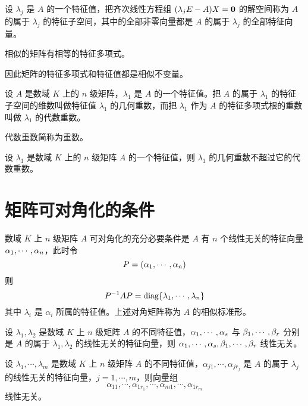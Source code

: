 设 $\lambda_j$ 是 $A$ 的一个特征值，把齐次线性方程组 $(\lambda_jE-A)X = \boldsymbol{0}$ 的解空间称为 $A$ 的属于 $\lambda_j$ 的特征子空间，其中的全部非零向量都是 $A$ 的属于 $\lambda_j$ 的全部特征向量。

\begin{theorem}
    相似的矩阵有相等的特征多项式。
\end{theorem}

因此矩阵的特征多项式和特征值都是相似不变量。

\begin{definition}
    设 $A$ 是数域 $K$ 上的 $n$ 级矩阵，$\lambda_1$ 是 $A$ 的一个特征值。把 $A$ 的属于 $\lambda_1$ 的特征子空间的维数叫做特征值 $\lambda_1$ 的几何重数，而把 $\lambda_1$ 作为 $A$ 的特征多项式根的重数叫做 $\lambda_1$ 的代数重数。 
\end{definition}

代数重数简称为重数。

\begin{theorem}
    设 $\lambda_1$ 是数域 $K$ 上的 $n$ 级矩阵 $A$ 的一个特征值，则 $\lambda_1$ 的几何重数不超过它的代数重数。
\end{theorem}

\section{矩阵可对角化的条件}

\begin{theorem}
    数域 $K$ 上 $n$ 级矩阵 $A$ 可对角化的充分必要条件是 $A$ 有 $n$ 个线性无关的特征向量 $\alpha_1,\cdots,\alpha_n$，此时令
    \[P=(\alpha_1,\cdots,\alpha_n)\]
    则
    \[P^{-1}AP = \operatorname{diag}\{\lambda_1,\cdots,\lambda_n\}\]
    其中 $\lambda_i$ 是 $\alpha_i$ 所属的特征值。上述对角矩阵称为 $A$ 的相似标准形。
\end{theorem}

\begin{theorem}
    设 $\lambda_1,\lambda_2$ 是数域 $K$ 上 $n$ 级矩阵 $A$ 的不同特征值，$\alpha_1,\cdots,\alpha_s$ 与 $\beta_1,\cdots,\beta_r$ 分别是 $A$ 的属于 $\lambda_1,\lambda_2$ 的线性无关的特征向量，则 $\alpha_1,\cdots,\alpha_s,\beta_1,\cdots,\beta_r$ 线性无关。
\end{theorem}

\begin{theorem}
    设 $\lambda_1,\cdots,\lambda_m$ 是数域 $K$ 上 $n$ 级矩阵 $A$ 的不同特征值，$\alpha_{j1},\cdots,\alpha_{jr_j}$ 是 $A$ 的属于 $\lambda_j$ 的线性无关的特征向量，$j=1,\cdots,m$，则向量组
    \[\alpha_{11},\cdots,\alpha_{1r_1},\cdots,\alpha_{m1},\cdots,\alpha_{1r_m}\]
    线性无关。
\end{theorem}

